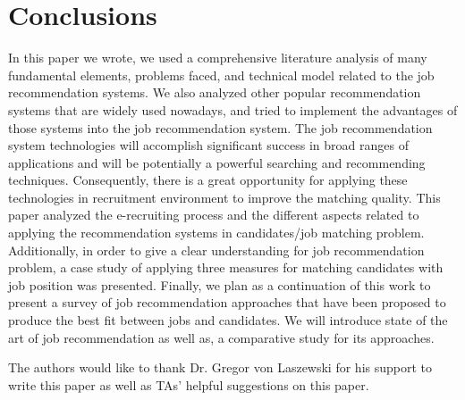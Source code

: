 \documentclass[sigconf]{acmart}
\begin{document}
\section{Conclusions}
 In this paper we wrote, we used a comprehensive literature analysis of many fundamental elements, problems faced, and technical model related to the job recommendation systems. We also analyzed other popular recommendation systems that are widely used nowadays, and tried to implement the advantages of those systems into the job recommendation system. The job recommendation system technologies will accomplish significant success in broad ranges of applications and will be potentially a powerful searching and recommending techniques. Consequently, there is a great opportunity for applying these technologies in recruitment environment to improve the matching quality. This paper analyzed the e-recruiting process and the different aspects related to applying the recommendation systems in candidates/job matching problem. Additionally, in order to give a clear understanding for job recommendation problem, a case study of applying three measures for matching candidates with job position was presented. Finally, we plan as a continuation of this work to present a survey of job recommendation approaches that have been proposed to produce the best fit between jobs and candidates. We will introduce state of the art of job recommendation as well as, a comparative study for its approaches.

\begin{acks}

The authors would like to thank Dr. Gregor von Laszewski for his support to write this paper as well as TAs' helpful suggestions on this paper. 

\end{acks}




 
\end{document}
